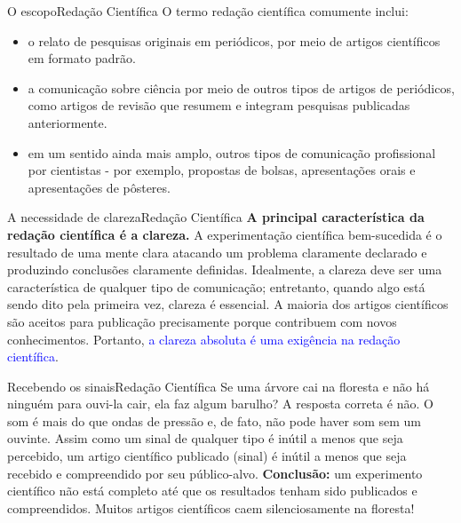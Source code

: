 \documentclass[t]{beamer}
\begin{document}


\begin{ftst}{O escopo}{Redação Científica}
\justifying
O termo redação científica comumente inclui:
\vone
\begin{itemize}
    \item o relato de pesquisas originais em periódicos, por meio de artigos científicos em formato padrão.
    \item a comunicação sobre ciência por meio de outros tipos de artigos de periódicos, como artigos de revisão que resumem e integram pesquisas publicadas anteriormente.
    \item em um sentido ainda mais amplo, outros tipos de comunicação profissional por cientistas - por exemplo, propostas de bolsas, apresentações orais e apresentações de pôsteres.
\end{itemize}


\end{ftst}


\begin{ftst}{A necessidade de clareza}{Redação Científica}
\justifying
\textbf{A principal característica da redação científica é a clareza.}
\vone
A experimentação científica bem-sucedida é o resultado de uma mente clara atacando um problema claramente declarado e produzindo conclusões claramente definidas.
\vone
Idealmente, a clareza deve ser uma característica de qualquer tipo de comunicação; entretanto, quando algo está sendo dito pela primeira vez, clareza é essencial.
\vone
A maioria dos artigos científicos são aceitos para publicação precisamente porque contribuem com novos conhecimentos. Portanto, \textcolor{blue}{a clareza absoluta é uma exigência na redação científica}.

\end{ftst}



\begin{ftst}{Recebendo os sinais}{Redação Científica}
\justifying
Se uma árvore cai na floresta e não há ninguém para ouvi-la cair, ela faz algum barulho?
\vone
A resposta correta é não. O som é mais do que ondas de pressão e, de fato, não pode haver som sem um ouvinte.
\vone
Assim como um sinal de qualquer tipo é inútil a menos que seja percebido, um artigo científico publicado (sinal) é inútil a menos que seja recebido e compreendido por seu público-alvo.
\vone
\textbf{Conclusão:} um experimento científico não está completo até que os resultados tenham sido publicados e compreendidos.
\vone
Muitos artigos científicos caem silenciosamente na floresta!

\end{ftst}
\end{document}
